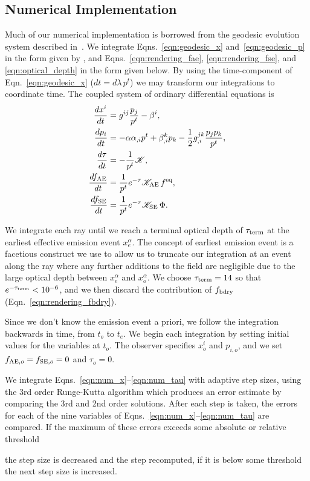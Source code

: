 \documentclass[aps,floatfix,prd,superscriptaddress,twocolumn]{revtex4-1}
\newcommand{\todo}[1]{\marginpar{\tiny{\textcolor{red}{#1}}}}
\renewcommand\todo[1]{} %
\begin{document}
\subsection{Numerical Implementation}
\label{ssec:numerical}
Much of our numerical implementation is borrowed from the geodesic evolution
system described in~\cite{bohn2016-code}.
We integrate Eqns.~\ref{eqn:geodesic_x} and~\ref{eqn:geodesic_p} in the form
given by \citep{hugh1994-eh_finding},
and Eqns.~\ref{eqn:rendering_fae}, \ref{eqn:rendering_fse},
and \ref{eqn:optical_depth} in the form given below.
By using the time-component of Eqn.~\ref{eqn:geodesic_x} ($dt=d\lambda \, p^t$)
we may transform our integrations to coordinate time.
The coupled system of ordinary differential equations is
\begin{align}
  \label{eqn:num_x}
  \frac{dx^i}{dt} &=
  g^{ij} \frac{p_j}{p^t} - \beta^{i},\\
  \label{eqn:num_p}
  \frac{dp_i}{dt} &=
  -\alpha \alpha_{,i} p^t
  + \beta^k_{,i} p_k
  - \frac{1}{2} g^{jk}_{,i}\frac{p_j p_k}{p^t},\\
  \label{eqn:num_tau}
  \frac{d\tau}{dt} &=
  - \frac{1}{p^t}\mathscr{K},\\
  \label{eqn:num_fae}
  \frac{df_{\rm AE}}{dt} &=
  \frac{1}{p^t}e^{-\tau}\mathscr{K_{\rm AE}} \,f^{\rm eq},\\
  \label{eqn:num_fse}
  \frac{df_{\rm SE}}{dt} &=
  \frac{1}{p^t}e^{-\tau}\mathscr{K_{\rm SE}} \,\Phi.
\end{align}

We integrate each ray until we reach a terminal optical depth of
$\tau_{\rm term}$ at the earliest effective emission event $x_e^\alpha$.
The concept of earliest emission event is a facetious construct we use
to allow us to truncate our integration at an event along the ray where any
further additions to the field are negligible due to the large optical depth
between $x_e^\alpha$ and $x_o^\alpha$.
We choose $\tau_{\rm term}=14$ so that $e^{-\tau_{\rm term}}<10^{-6}$,
and we then discard the contribution of $f_{\rm bdry}$
(Eqn.~\ref{eqn:rendering_fbdry}).

Since we don't know the emission event a priori,
we follow the integration backwards in time,
from $t_o$ to $t_e$.
We begin each integration by setting initial values for the variables at $t_o$.
The observer specifies $x^i_o$ and $p_{i,o}$,
and we set $f_{{\rm AE},o}=f_{{\rm SE},o}=0$ and $\tau_o=0$.

We integrate Eqns.~\ref{eqn:num_x}--\ref{eqn:num_tau} with adaptive step sizes,
using the 3rd order Runge-Kutta algorithm
which produces an error estimate by comparing the 3rd and 2nd order solutions.
After each step is taken, the errors for each of the nine variables of
Eqns.~\ref{eqn:num_x}--\ref{eqn:num_tau} are compared.
If the maximum of these errors exceeds some absolute or relative threshold
\todo{specify ScaledAbsRel algorithm}
the step size is decreased and the step recomputed,
if it is below some threshold the next step size is increased.
\todo{specify}
\end{document}
